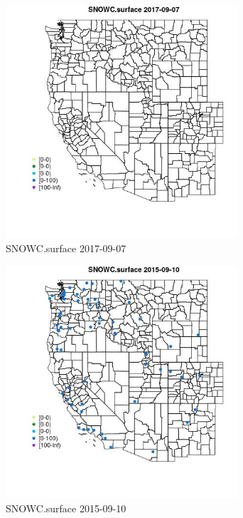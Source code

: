 \begin{figure} 
\centering  
\includegraphics[width=0.77\textwidth]{Code_Outputs/Report_ML_input_PM25_Step4_part_e_de_duplicated_aveswNAs_MapObsSNOWCsurface2017-09-07.jpg} 
\caption{\label{fig:Report_ML_input_PM25_Step4_part_e_de_duplicated_aveswNAsMapObsSNOWCsurface2017-09-07}SNOWC.surface 2017-09-07} 
\end{figure} 
 

\begin{figure} 
\centering  
\includegraphics[width=0.77\textwidth]{Code_Outputs/Report_ML_input_PM25_Step4_part_e_de_duplicated_aveswNAs_MapObsSNOWCsurface2015-09-10.jpg} 
\caption{\label{fig:Report_ML_input_PM25_Step4_part_e_de_duplicated_aveswNAsMapObsSNOWCsurface2015-09-10}SNOWC.surface 2015-09-10} 
\end{figure} 
 

